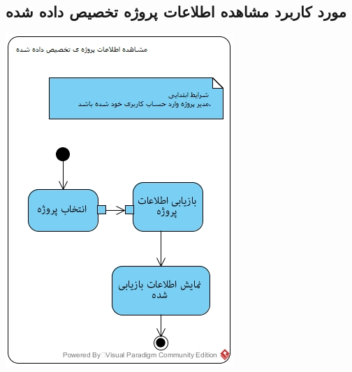 \subsection*{مورد کاربرد مشاهده اطلاعات پروژه تخصیص داده شده}
\vspace{2cm}
\begin{center}
\includegraphics[width=\textwidth]{ActivityDiagrams/17.jpg}
\end{center}

\newpage
\vspace{2cm}
